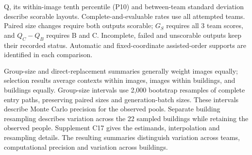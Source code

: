 Q, its within-image tenth percentile (P10) and between-team standard deviation describe scorable layouts. Complete-and-evaluable rates use all attempted teams. Paired size changes require both outputs scorable; $G_S$ requires all 3 team scores, and $Q_C-Q_B$ requires B and C. Incomplete, failed and unscorable outputs keep their recorded status. Automatic and fixed-coordinate assisted-order supports are identified in each comparison.

Group-size and direct-replacement summaries generally weight images equally; selection results average contexts within images, images within buildings, and buildings equally. Group-size intervals use 2,000 bootstrap resamples of complete entry paths, preserving paired sizes and generation-batch sizes. These intervals describe Monte Carlo precision for the observed pools. Separate building resampling describes variation across the 22 sampled buildings while retaining the observed people. Supplement C17 gives the estimands, interpolation and resampling details. The resulting summaries distinguish variation across teams, computational precision and variation across buildings.
